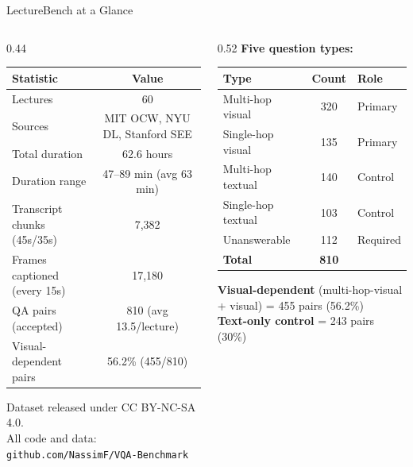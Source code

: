 \documentclass[aspectratio=169,t]{beamer}
\begin{document}
\begin{frame}{LectureBench at a Glance}

\begin{columns}[T]
\begin{column}{0.44\textwidth}
  \small
  \begin{tabular}{lc}
  \toprule
  Statistic & Value \\
  \midrule
  Lectures                      & 60 \\
  Sources                       & MIT OCW, NYU DL, Stanford SEE \\
  Total duration                & 62.6 hours \\
  Duration range                & 47--89 min (avg 63 min) \\
  Transcript chunks (45s/35s)   & 7,382 \\
  Frames captioned (every 15s)  & 17,180 \\
  QA pairs (accepted)           & 810 (avg 13.5/lecture) \\
  Visual-dependent pairs        & 56.2\% (455/810) \\
  \bottomrule
  \end{tabular}

  \medskip\footnotesize
  Dataset released under CC BY-NC-SA 4.0.\\
  All code and data: \texttt{github.com/NassimF/VQA-Benchmark}
\end{column}
\begin{column}{0.52\textwidth}
  \textbf{Five question types:}
  \medskip
  \small
  \begin{tabular}{lcl}
  \toprule
  Type & Count & Role \\
  \midrule
  Multi-hop visual & 320 & Primary \\
  Single-hop visual & 135 & Primary \\
  Multi-hop textual & 140 & Control \\
  Single-hop textual & 103 & Control \\
  Unanswerable & 112 & Required \\
  \midrule
  \textbf{Total} & \textbf{810} & \\
  \bottomrule
  \end{tabular}

  \medskip
  \textbf{Visual-dependent} (multi-hop-visual + visual) = 455 pairs (56.2\%)\\
  \textbf{Text-only control} = 243 pairs (30\%)
\end{column}
\end{columns}

\end{frame}
\end{document}
